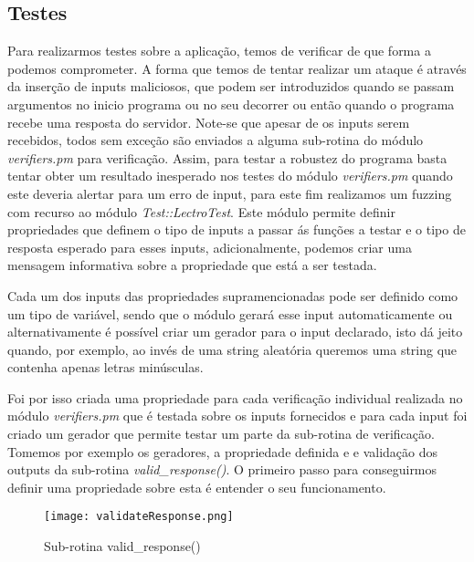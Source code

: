 \subsection{Testes}

\par Para realizarmos testes sobre a aplicação, temos de verificar de que forma a podemos comprometer. A forma que temos de tentar realizar um ataque é através da inserção de inputs maliciosos, que podem ser introduzidos quando se passam argumentos no inicio programa ou no seu decorrer ou então quando o programa recebe uma resposta do servidor. Note-se que apesar de os inputs serem recebidos, todos sem exceção são enviados a alguma sub-rotina do módulo \textit{verifiers.pm} para verificação. Assim, para testar a robustez do programa basta tentar obter um resultado inesperado nos testes do módulo \textit{verifiers.pm} quando este deveria alertar para um erro de input, para este fim realizamos um fuzzing com recurso ao módulo \textit{Test::LectroTest}\cite{testelectro}. Este módulo permite definir propriedades que definem o tipo de inputs a passar ás funções a testar e o tipo de resposta esperado para esses inputs, adicionalmente, podemos criar uma mensagem informativa sobre a propriedade que está a ser testada.
\par Cada um dos inputs das propriedades supramencionadas pode ser definido como um tipo de variável, sendo que o módulo gerará esse input automaticamente ou alternativamente é possível criar um gerador para o input declarado, isto dá jeito quando, por exemplo, ao invés de uma string aleatória queremos uma string que contenha apenas letras minúsculas.
\par Foi por isso criada uma propriedade para cada verificação individual realizada no módulo \textit{verifiers.pm} que é testada sobre os inputs fornecidos e para cada input foi criado um gerador que permite testar um parte da sub-rotina de verificação. Tomemos por exemplo os geradores, a propriedade definida e e validação dos outputs da sub-rotina \textit{valid\_response()}. O primeiro passo para conseguirmos definir uma propriedade sobre esta é entender o seu funcionamento.
\begin{figure}[H]

  \centering
  \captionsetup{justification=centering}

  \texttt{[image: validateResponse.png]}
  
  \caption {Sub-rotina valid\_response()}

\end{figure}
